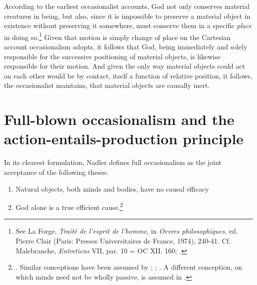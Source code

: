 According to the earliest occasionalist accounts, God not only conserves material creatures in being, but also, since it is impossible to preserve a material object in existence without preserving it somewhere, must conserve them in a specific \emph{place} in doing so.\footnote{See La Forge, \emph{Traité de l'esprit de l'homme}, in \emph{Oevres philosophiques}, ed. Pierre Clair (Paris: Presses Universitaires de France, 1974), 240-41. Cf. Malebranche, \emph{Entretiens} VII, par. 10 = OC XII. 160; \autocite{Nadler1998}.} Given that motion is simply change of place on the Cartesian account occasionalism adopts, it follows that God, being immediately and solely responsible for the successive positioning of material objects, is likewise responsible for their motion. And given the only way material objects could act on each other would be by contact, itself a function of relative position, it follows, the occasionalist maintains, that material objects are causally inert.

\section{Full-blown occasionalism and the action-entails-production principle}
In its clearest formulation, Nadler defines full occasionalism as the joint acceptance of the following theses:

\begin{enumerate}
	\item Natural objects, both minds and bodies, have no causal efficacy
	\item God alone is a true efficient cause.\footnote{\autocite[39]{Nadler2005}. Similar conceptions have been assumed by \autocite[174]{Battail1973}; \autocite[45-46]{Pyle2003}; \autocite[288]{Winkler2011}. A different conception, on which minds need not be wholly passive, is assumed in \autocite[358]{Radner1993}.}
\end{enumerate}


